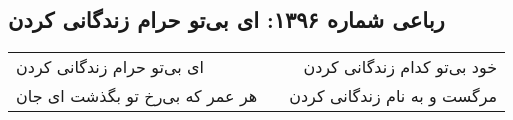 \begin{center}
\section*{رباعی شماره ۱۳۹۶: ای بی‌تو حرام زندگانی کردن}
\label{sec:1396}
\begin{longtable}{l p{0.5cm} r}
ای بی‌تو حرام زندگانی کردن
&&
خود بی‌تو کدام زندگانی کردن
\\
هر عمر که بی‌رخ تو بگذشت ای جان
&&
مرگست و به نام زندگانی کردن
\\
\end{longtable}
\end{center}
